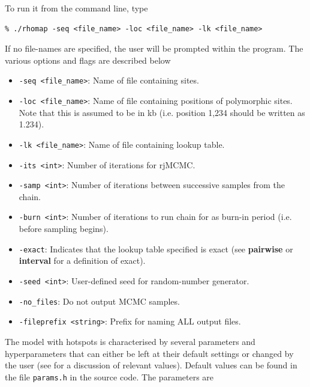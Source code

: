 \documentclass[a4paper,10pt,fullpage]{article}
\begin{document}
To run it from the
command line, type\\
\begin{verbatim}
% ./rhomap -seq <file_name> -loc <file_name> -lk <file_name> 
\end{verbatim}
If no file-names are specified, the user will be prompted within
the program.   The various options and flags are described below
\begin{itemize}

\item \verb+-seq <file_name>+: Name of file containing sites.

\item \verb+-loc <file_name>+: Name of file containing positions of polymorphic sites.  Note that this is assumed to be in kb (i.e. position 1,234 should be written as 1.234).

\item \verb+-lk <file_name>+: Name of file containing lookup table.

\item \verb+-its <int>+: Number of iterations for rjMCMC.

\item \verb+-samp <int>+: Number of iterations between successive samples from the chain.

\item \verb+-burn <int>+: Number of iterations to run chain for as burn-in period (i.e. before sampling begins).

\item \verb+-exact+: Indicates that the lookup table specified is exact (see {\bf pairwise} or {\bf interval} for a definition of exact).  

\item \verb+-seed <int>+: User-defined seed for random-number generator.

\item \verb+-no_files+: Do not output MCMC samples.

\item \verb+-fileprefix <string>+: Prefix for naming ALL output files.

\end{itemize}

The model with hotspots is characterised by several parameters and hyperparameters that can either be left at their default settings or changed by the user (see \cite{AutonMcVean07} for a discussion of relevant values).  Default values can be found in the file \verb+params.h+ in the source code.  The parameters are
\end{document}
